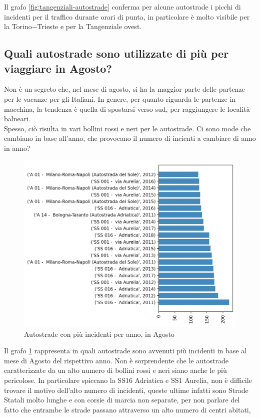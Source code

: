 \documentclass[a4paper]{report}
\begin{document}
Il grafo \ref{fig:tangenziali-autostrade} conferma per alcune autostrade i picchi di 
incidenti per il traffico durante orari di punta, 
in particolare è molto visibile per la Torino$-$Trieste e per la Tangenziale ovest.


\subsection{Quali autostrade sono utilizzate di più per viaggiare in Agosto?}

Non è un segreto che, nel mese di agosto, si ha la maggior parte delle partenze per le vacanze per 
gli Italiani. In genere, per quanto riguarda le partenze in macchina, la tendenza è quella di spostarsi verso sud, 
per raggiungere le località balneari.\\
Spesso, ciò risulta in vari bollini rossi e neri per le autostrade. 
Ci sono mode che cambiano in base all'anno, 
che provocano il numero di incienti a cambiare di anno in anno? 

\begin{figure}
    \includegraphics[width=\linewidth]{../src/incidenti/incidenti_aci/agosto/autostrade_anno_agosto.png}
    \caption{Autostrade con più incidenti per anno, in Agosto}
    \label{fig:autostrade-anno-agosto}
\end{figure}

Il grafo \ref{fig:autostrade-anno-agosto} rappresenta in quali autostrade sono avvenuti 
più incidenti in base al mese di Agosto del rispettivo anno.
Non è sorprendente che le autostrade caratterizzate da un alto numero di bollini rossi e neri 
siano anche le più pericolose.
In particolare spiccano la SS16 Adriatica e SS1 Aurelia, non è difficile trovare il motivo 
dell'alto numero di incidenti, 
queste ultime infatti sono Strade Statali molto lunghe e con corsie di marcia non separate, 
per non parlare del fatto che entrambe le strade passano attraverso un alto numero di centri abitati, 
\end{document}
